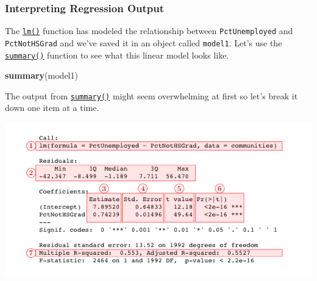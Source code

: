 \documentclass[]{article}
\newenvironment{Shaded}{\begin{snugshade}}{\end{snugshade}}
\newcommand{\KeywordTok}[1]{\textcolor[rgb]{0.13,0.29,0.53}{\textbf{#1}}}
\newcommand{\NormalTok}[1]{#1}
\begin{document}
\hypertarget{interpreting-regression-output}{%
\subsubsection{Interpreting Regression Output}\label{interpreting-regression-output}}

The \href{http://bit.ly/R_lm}{\texttt{lm()}} function has modeled the relationship between \texttt{PctUnemployed} and \texttt{PctNotHSGrad} and we've saved it in an object called \texttt{model1}. Let's use the \href{http://bit.ly/R_summary}{\texttt{summary()}} function to see what this linear model looks like.

\begin{Shaded}
\begin{Highlighting}[]
\KeywordTok{summary}\NormalTok{(model1)}
\end{Highlighting}
\end{Shaded}

The output from \href{http://bit.ly/R_summary}{\texttt{summary()}} might seem overwhelming at first so let's break it down one item at a time.

\includegraphics[width=7.29167in,height=\textheight]{img/lm-annotated-1.png}
\end{document}
